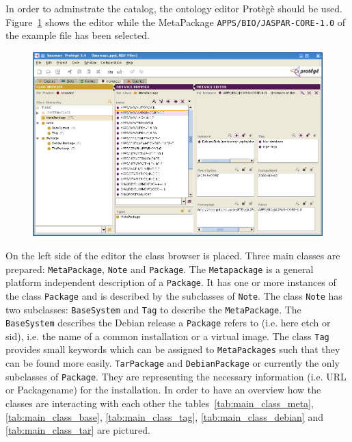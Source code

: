 In order to adminstrate the catalog, the ontology editor Prot\`eg\`e should be used. Figure~\ref{fig:protege_example} shows the
editor while the MetaPackage \texttt{APPS/BIO/JASPAR-CORE-1.0} of the example file has been selected.
\begin{figure}
  \begin{center}
    \includegraphics[width=\textwidth]{images/protege_JASPAR.png}
    \label{fig:protege_example}
  \end{center}
\end{figure}
On the left side of the editor the class browser is placed. Three main classes are prepared: \texttt{MetaPackage}, \texttt{Note} and \texttt{Package}.
The \texttt{Metapackage} is a general platform independent description of a \texttt{Package}. 
It has one or more instances of the class \texttt{Package} and is
described by the subclasses of \texttt{Note}. The class \texttt{Note} has two subclasses: \texttt{BaseSystem} 
and \texttt{Tag} to describe the \texttt{MetaPackage}. The \texttt{BaseSystem} describes the Debian release a \texttt{Package} refers to
(i.e. here etch or sid), i.e. the name of a common installation or a virtual image.
The class \texttt{Tag} provides small keywords which can be assigned to \texttt{MetaPackages} such that
they can be found more easily.  \texttt{TarPackage} and \texttt{DebianPackage} or currently the only subclasses of \texttt{Package}.
They are representing the necessary information (i.e. URL or Packagename) for the installation. In order to have an overview how the 
classes are interacting with each other the tables~\ref{tab:main_class_meta}, \ref{tab:main_class_base}, \ref{tab:main_class_tag},
\ref{tab:main_class_debian} and \ref{tab:main_class_tar} are pictured.

